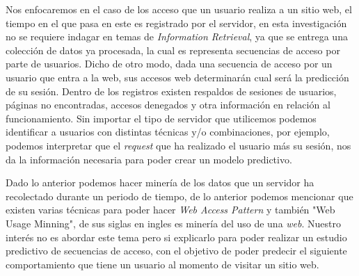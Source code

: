 
Nos enfocaremos en el caso de los acceso que un usuario realiza a un sitio web, el tiempo en el que pasa en este es registrado por el servidor, en esta investigación no se requiere indagar en temas de \emph{Information Retrieval}, ya que se entrega una colección de datos ya procesada, la cual es representa secuencias de acceso por parte de usuarios. 
Dicho de otro modo, dada una secuencia de acceso por un usuario que entra a la web, sus accesos web determinarán cual será la predicción de su sesión. Dentro de los registros existen respaldos de sesiones de usuarios, páginas no encontradas, accesos denegados y otra información en relación al funcionamiento. Sin importar el tipo de servidor que utilicemos podemos identificar a usuarios con distintas técnicas y/o combinaciones, por ejemplo, podemos interpretar que el \emph{request} que ha realizado el usuario más su sesión, nos da la información necesaria para poder crear un modelo predictivo. 

Dado lo anterior podemos hacer minería de los datos que un servidor ha recolectado durante un periodo de tiempo, de lo anterior  podemos mencionar que existen varias técnicas para poder hacer \emph{Web Access Pattern } y también  "Web Usage Minning", de sus siglas en ingles es minería del uso de una \emph{web}. Nuestro interés no es abordar este tema pero si explicarlo para poder realizar un estudio predictivo de secuencias de acceso, con el objetivo de poder predecir el siguiente comportamiento que tiene un usuario al momento de visitar un sitio web.







